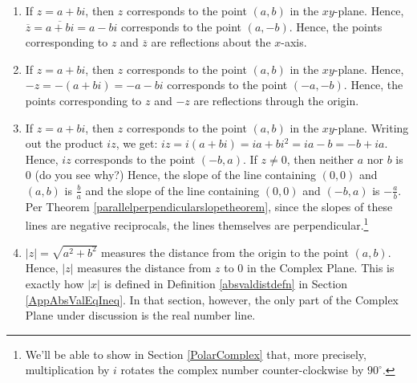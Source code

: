 \begin{enumerate}
\setcounter{enumi}{\value{HW}}

\item If $z = a+bi$, then $z$ corresponds to the point $(a,b)$ in the $xy$-plane.  Hence, $\overline{z} = \overline{a+bi} = a-bi$ corresponds to the point $(a,-b)$.  Hence, the points corresponding to $z$ and $\overline{z}$ are reflections about the $x$-axis.

\item    If $z = a+bi$, then $z$ corresponds to the point $(a,b)$ in the $xy$-plane.  Hence, $-z =-(a+bi) = -a-bi$ corresponds to the point $(-a,-b)$.  Hence, the points corresponding to $z$ and $-z$ are reflections through the origin.

\item  If $z = a+bi$, then $z$ corresponds to the point $(a,b)$ in the $xy$-plane.  Writing out the product $iz$, we get: $iz =i(a+bi) = ia+bi^2 = ia - b = -b+ia$.  Hence, $iz$ corresponds to the point $(-b,a)$.  If $z \neq 0$, then neither $a$ nor $b$ is $0$ (do you see why?) Hence, the slope of the line containing $(0,0)$ and $(a,b)$ is $\frac{b}{a}$ and the slope of the line containing $(0,0)$ and $(-b,a)$ is $-\frac{a}{b}$.  Per Theorem \ref{parallelperpendicularslopetheorem}, since the slopes of these lines are negative reciprocals, the lines themselves are perpendicular.\footnote{We'll be able to show in Section \ref{PolarComplex}  that, more precisely, multiplication by $i$ rotates the complex number counter-clockwise by $90^{\circ}$.}

\item $|z| = \sqrt{a^2+b^2}$ measures the distance from the origin to the point $(a,b)$.  Hence, $|z|$ measures the distance from $z$ to $0$ in the Complex Plane.  This is exactly how $|x|$ is defined in Definition \ref{absvaldistdefn} in Section \ref{AppAbsValEqIneq}.  In that section, however,  the only part of the Complex Plane under discussion is the real number line.

\setcounter{HW}{\value{enumi}}
\end{enumerate}


